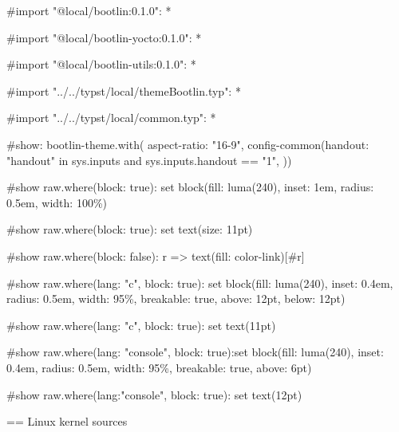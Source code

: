 #import "@local/bootlin:0.1.0": *

#import "@local/bootlin-yocto:0.1.0": *

#import "@local/bootlin-utils:0.1.0": *

#import "../../typst/local/themeBootlin.typ": *

#import "../../typst/local/common.typ": *

#show: bootlin-theme.with( aspect-ratio: "16-9", config-common(handout: "handout" in sys.inputs and sys.inputs.handout == "1", ))

#show raw.where(block: true): set block(fill: luma(240), inset: 1em, radius: 0.5em, width: 100\%)

#show raw.where(block: true): set text(size: 11pt)

#show raw.where(block: false): r => text(fill: color-link)[#r]

#show raw.where(lang: "c", block: true): set block(fill: luma(240), inset: 0.4em, radius: 0.5em, width: 95\%, breakable: true, above: 12pt, below: 12pt)

#show raw.where(lang: "c", block: true): set text(11pt)

#show raw.where(lang: "console", block: true):set block(fill: luma(240), inset: 0.4em, radius: 0.5em, width: 95\%, breakable: true, above: 6pt)

#show raw.where(lang:"console", block: true): set text(12pt)

 == Linux kernel sources

